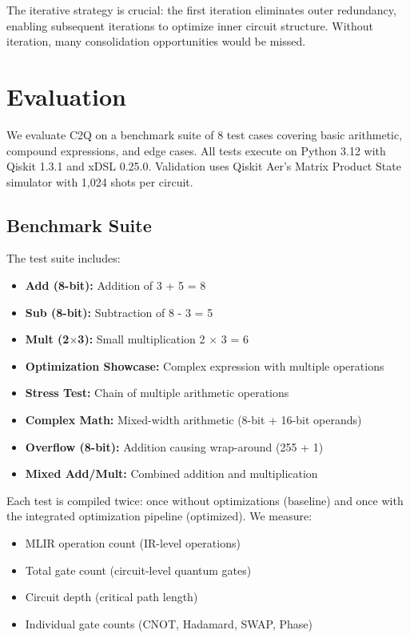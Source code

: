 \documentclass[a4paper,twocolumn]{article}
\begin{document}
The iterative strategy is crucial: the first iteration eliminates outer redundancy, enabling subsequent iterations
to optimize inner circuit structure. Without iteration, many consolidation opportunities would be missed.

\section{Evaluation}

We evaluate C2Q on a benchmark suite of 8 test cases covering basic arithmetic, compound expressions, and edge cases.
All tests execute on Python 3.12 with Qiskit 1.3.1 and xDSL 0.25.0. Validation uses Qiskit Aer's Matrix Product State
simulator with 1,024 shots per circuit.

\subsection{Benchmark Suite}

The test suite includes:
\begin{itemize}
  \item \textbf{Add (8-bit):} Addition of 3 + 5 = 8
  \item \textbf{Sub (8-bit):} Subtraction of 8 - 3 = 5
  \item \textbf{Mult (2$\times$3):} Small multiplication 2 $\times$ 3 = 6
  \item \textbf{Optimization Showcase:} Complex expression with multiple operations
  \item \textbf{Stress Test:} Chain of multiple arithmetic operations
  \item \textbf{Complex Math:} Mixed-width arithmetic (8-bit + 16-bit operands)
  \item \textbf{Overflow (8-bit):} Addition causing wrap-around (255 + 1)
  \item \textbf{Mixed Add/Mult:} Combined addition and multiplication
\end{itemize}

Each test is compiled twice: once without optimizations (baseline) and once with the integrated optimization pipeline (optimized). We measure:
\begin{itemize}
  \item MLIR operation count (IR-level operations)
  \item Total gate count (circuit-level quantum gates)
  \item Circuit depth (critical path length)
  \item Individual gate counts (CNOT, Hadamard, SWAP, Phase)
\end{itemize}
\end{document}
